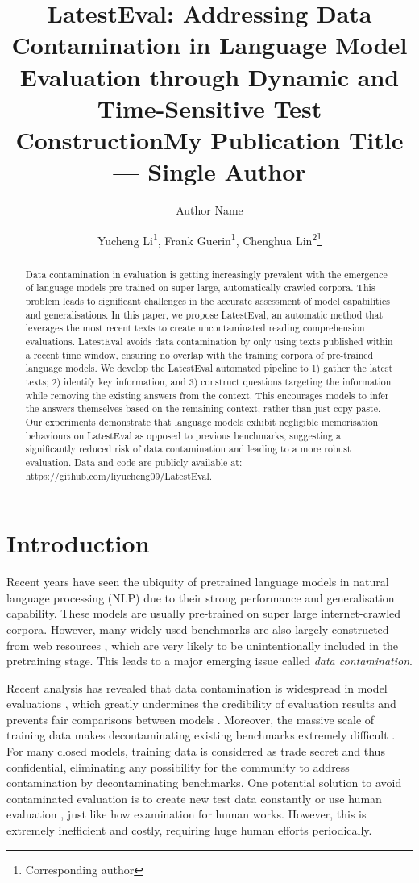 \documentclass[letterpaper]{article} %
\title{LatestEval: Addressing Data Contamination in Language Model Evaluation through Dynamic and Time-Sensitive Test Construction}
\title{My Publication Title --- Single Author}
\author {
    Author Name
}
\author {
    Yucheng Li\textsuperscript{\rm 1},
    Frank Guerin\textsuperscript{\rm 1},
    Chenghua Lin\textsuperscript{\rm 2}\thanks{Corresponding author}
}
\begin{document}
\maketitle

\begin{abstract}
Data contamination in evaluation is getting increasingly prevalent with the emergence of language models pre-trained on super large, automatically crawled corpora. This problem leads to significant challenges in the accurate assessment of model capabilities and generalisations. In this paper, we propose LatestEval, an automatic method that leverages the most recent texts to create uncontaminated reading comprehension evaluations. LatestEval avoids data contamination by only using texts published within a recent time window, ensuring no overlap with the training corpora of pre-trained language models. We develop the LatestEval automated pipeline to 1) gather the latest texts; 2) identify key information, and 3) construct questions targeting the information while removing the existing answers from the context. This encourages models to infer the answers themselves based on the remaining context, rather than just copy-paste. Our experiments demonstrate that language models exhibit negligible memorisation behaviours on LatestEval as opposed to previous benchmarks, suggesting a significantly reduced risk of data contamination and leading to a more robust evaluation. Data and code are publicly available at: \url{https://github.com/liyucheng09/LatestEval}.
\end{abstract}

\section{Introduction}

Recent years have seen the ubiquity of pretrained language models in natural language processing (NLP) due to their strong performance and generalisation capability. These models are usually pre-trained on super large internet-crawled corpora. However, many widely used benchmarks are also largely constructed from web resources \cite{hendrycks2021measuring}, which are very likely to be unintentionally included in the pretraining stage. This leads to a major emerging issue called \textit{data contamination}.

Recent analysis has revealed that data contamination is widespread in model evaluations \cite{openai2023gpt4,anil2023palm}, which greatly undermines the credibility of evaluation results \cite{marie2023,narayanan_kapoor2023} and prevents fair comparisons between models \cite{dickson2023}. Moreover, the massive scale of training data makes decontaminating existing benchmarks extremely difficult \cite{kreutzer-etal-2022-quality}. For many closed models, training data is considered as trade secret and thus confidential, eliminating any possibility for the community to address contamination by decontaminating benchmarks.
One potential solution to avoid contaminated evaluation is to create new test data constantly or use human evaluation \cite{liu2023evaluating,jacovi2023stop}, just like how examination for human works. However, this is extremely inefficient and costly, requiring huge human efforts periodically. 
\end{document}
